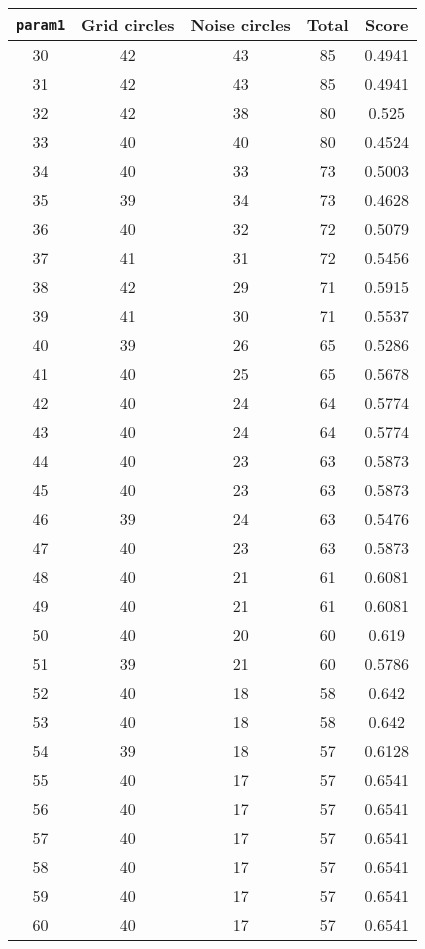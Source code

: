 \documentclass[letterpaper, 12pt]{article}
\begin{document}
\begin{longtable}{|c|c|c|c|c|}
\hline
\textbf{\texttt{param1}} & \textbf{Grid circles} & \textbf{Noise circles} & \textbf{Total} & \textbf{Score} \\
\hline
30 & 42 & 43 & 85 & 0.4941 \\
\hline
31 & 42 & 43 & 85 & 0.4941 \\
\hline
32 & 42 & 38 & 80 & 0.525 \\
\hline
33 & 40 & 40 & 80 & 0.4524 \\
\hline
34 & 40 & 33 & 73 & 0.5003 \\
\hline
35 & 39 & 34 & 73 & 0.4628 \\
\hline
36 & 40 & 32 & 72 & 0.5079 \\
\hline
37 & 41 & 31 & 72 & 0.5456 \\
\hline
38 & 42 & 29 & 71 & 0.5915 \\
\hline
39 & 41 & 30 & 71 & 0.5537 \\
\hline
40 & 39 & 26 & 65 & 0.5286 \\
\hline
41 & 40 & 25 & 65 & 0.5678 \\
\hline
42 & 40 & 24 & 64 & 0.5774 \\
\hline
43 & 40 & 24 & 64 & 0.5774 \\
\hline
44 & 40 & 23 & 63 & 0.5873 \\
\hline
45 & 40 & 23 & 63 & 0.5873 \\
\hline
46 & 39 & 24 & 63 & 0.5476 \\
\hline
47 & 40 & 23 & 63 & 0.5873 \\
\hline
48 & 40 & 21 & 61 & 0.6081 \\
\hline
49 & 40 & 21 & 61 & 0.6081 \\
\hline
50 & 40 & 20 & 60 & 0.619 \\
\hline
51 & 39 & 21 & 60 & 0.5786 \\
\hline
52 & 40 & 18 & 58 & 0.642 \\
\hline
53 & 40 & 18 & 58 & 0.642 \\
\hline
54 & 39 & 18 & 57 & 0.6128 \\
\hline
55 & 40 & 17 & 57 & 0.6541 \\
\hline
56 & 40 & 17 & 57 & 0.6541 \\
\hline
57 & 40 & 17 & 57 & 0.6541 \\
\hline
58 & 40 & 17 & 57 & 0.6541 \\
\hline
59 & 40 & 17 & 57 & 0.6541 \\
\hline
60 & 40 & 17 & 57 & 0.6541 \\

\end{longtable}
\end{document}
